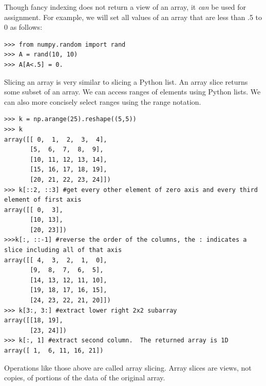 Though fancy indexing does not return a view of an array, it \emph{can} be used for assignment.
For example, we will set all values of an array that are less than .5 to 0 as follows:
\begin{lstlisting}
>>> from numpy.random import rand
>>> A = rand(10, 10)
>>> A[A<.5] = 0.
\end{lstlisting}

Slicing an array is very similar to slicing a Python list.
An array slice returns some subset of an array.
We can access ranges of elements using Python lists.
We can also more concisely select ranges using the  range notation.
\begin{lstlisting}
>>> k = np.arange(25).reshape((5,5))
>>> k
array([[ 0,  1,  2,  3,  4],
       [5,  6,  7,  8,  9],
       [10, 11, 12, 13, 14],
       [15, 16, 17, 18, 19],
       [20, 21, 22, 23, 24]])
>>> k[::2, ::3] #get every other element of zero axis and every third element of first axis
array([[ 0,  3],
       [10, 13],
       [20, 23]])
>>>k[:, ::-1] #reverse the order of the columns, the : indicates a slice including all of that axis
array([[ 4,  3,  2,  1,  0],
       [9,  8,  7,  6,  5],
       [14, 13, 12, 11, 10],
       [19, 18, 17, 16, 15],
       [24, 23, 22, 21, 20]])
>>> k[3:, 3:] #extract lower right 2x2 subarray
array([[18, 19],
       [23, 24]])
>>> k[:, 1] #extract second column.  The returned array is 1D
array([ 1,  6, 11, 16, 21])
\end{lstlisting}
Operations like those above are called array slicing.
Array slices are views, not copies, of portions of the data of the original array.


